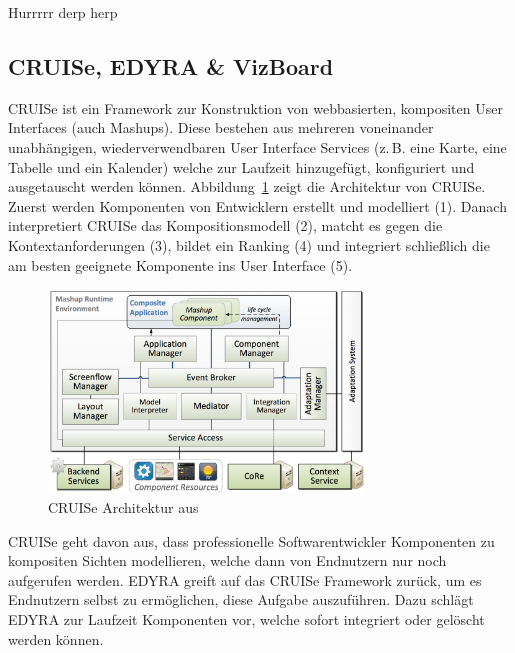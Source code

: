 \documentclass[
	headsepline,
	footsepline,
	fontsize=12pt,
	bibliography=totoc
]{scrbook}
\begin{document}
Hurrrrr derp herp

\subsection{CRUISe, EDYRA \& VizBoard}
\label{section:standderforschung:grundlagen:cruise_vizboard}

CRUISe \cite{Pietschmann2009, Pietschmann2012} ist ein Framework zur Konstruktion von webbasierten, kompositen User Interfaces (auch Mashups). Diese bestehen aus mehreren voneinander unabhängigen, wiederverwendbaren User Interface Services (z.\,B. eine Karte, eine Tabelle und ein Kalender) welche zur Laufzeit hinzugefügt, konfiguriert und ausgetauscht werden können. Abbildung~\ref{figure:cruise_architektur} zeigt die Architektur von CRUISe. Zuerst werden Komponenten von Entwicklern erstellt und modelliert (1). Danach interpretiert CRUISe das Kompositionsmodell (2), matcht es gegen die Kontextanforderungen (3), bildet ein Ranking (4) und integriert schließlich die am besten geeignete Komponente ins User Interface (5).

\begin{figure}[htbp]
	\centering
	\includegraphics[width=0.75\textwidth]{images/grundlagen-cruise_architektur.png}
	\caption{CRUISe Architektur aus \cite{Pietschmann2012}}
	\label{figure:cruise_architektur}
\end{figure}

CRUISe geht davon aus, dass professionelle Softwarentwickler Komponenten zu kompositen Sichten modellieren, welche dann von Endnutzern nur noch aufgerufen werden. EDYRA \cite{Ruempel2011} greift auf das CRUISe Framework zurück, um es Endnutzern selbst zu ermöglichen, diese Aufgabe auszuführen. Dazu schlägt EDYRA zur Laufzeit Komponenten vor, welche sofort integriert oder gelöscht werden können.
\end{document}
